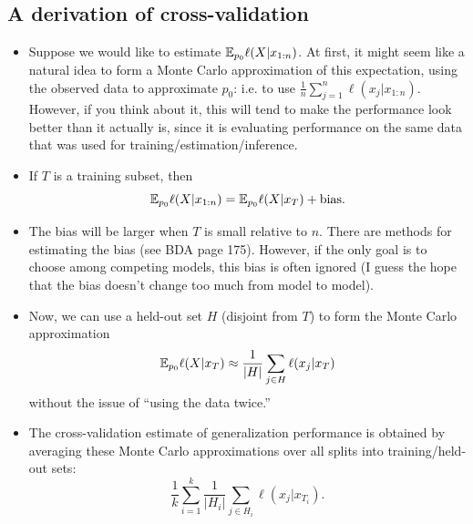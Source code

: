 \documentclass[12pt]{article}
\begin{document}
\subsection*{A derivation of cross-validation}
\begin{itemize}
\item Suppose we would like to estimate $\mathbb{E}_{p_0} \ell(X | x_{1:n})$. At first, it might seem like a natural idea to form a Monte Carlo approximation of this expectation, using the observed data to approximate $p_0$: i.e. to use $\frac{1}{n} \sum_{j = 1}^n \ell(x_j | x_{1:n})$. However, if you think about it, this will tend to make the performance look better than it actually is, since it is evaluating performance on the same data that was used for training/estimation/inference.
\item If $T$ is a training subset, then
 $$ \mathbb{E}_{p_0} \ell(X | x_{1:n}) = \mathbb{E}_{p_0} \ell(X | x_T) + \text{bias}. $$
\item The bias will be larger when $T$ is small relative to $n$. There are methods for estimating the bias (see BDA page 175). However, if the only goal is to choose among competing models, this bias is often ignored (I guess the hope that the bias doesn't change too much from model to model).
\item Now, we can use a held-out set $H$ (disjoint from $T$) to form the Monte Carlo approximation
 $$\mathbb{E}_{p_0} \ell(X | x_T) \approx \frac{1}{| H |}\sum_{j \in H} \ell(x_j | x_T)$$
 without the issue of ``using the data twice.''
\item The cross-validation estimate of generalization performance is obtained by averaging these Monte Carlo approximations over all splits into training/held-out sets:
 $$\frac{1}{k} \sum_{i = 1}^k \frac{1}{| H_i |}\sum_{j \in H_i} \ell(x_j | x_{T_i}).$$
\end{itemize}
\end{document}
